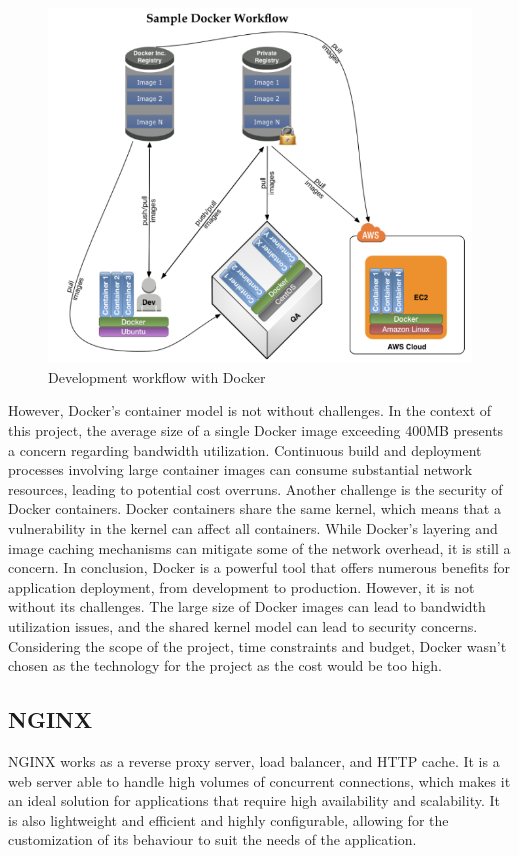 \begin{figure}[ht]
    \centering
    \includegraphics[width=0.8\linewidth]{images/docker.png}
    \caption{Development workflow with Docker}
    \label{fig:docker}
\end{figure}

However, Docker's container model is not without challenges. In the context of this project, the average size of a single Docker image exceeding 400MB presents a concern regarding bandwidth utilization. Continuous build and deployment processes involving large container images can consume substantial network resources, leading to potential cost overruns. \cite{merkel2014docker}
Another challenge is the security of Docker containers. Docker containers share the same kernel, which means that a vulnerability in the kernel can affect all containers. \cite{dockerhub}
While Docker's layering and image caching mechanisms can mitigate some of the network overhead, it is still a concern.
In conclusion, Docker is a powerful tool that offers numerous benefits for application deployment, from development to production. However, it is not without its challenges. The large size of Docker images can lead to bandwidth utilization issues, and the shared kernel model can lead to security concerns. Considering the scope of the project, time constraints and budget, Docker wasn't chosen as the technology for the project as the cost would be too high.


\subsection{NGINX}
NGINX works as a reverse proxy server, load balancer, and HTTP cache. It is a web server able to handle high volumes of concurrent connections,
which makes it an ideal solution for applications that require high availability and scalability. It is also lightweight and efficient
and highly configurable, allowing for the customization of its behaviour to suit the needs of the application.

